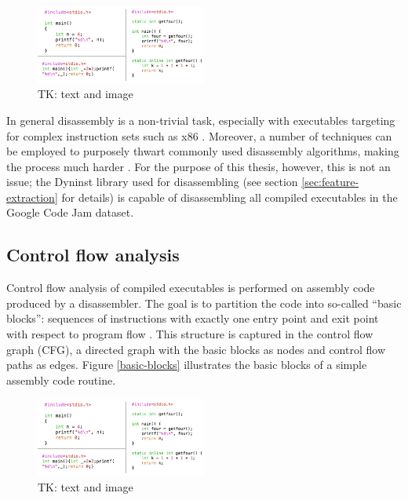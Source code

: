 \documentclass[a4paper,11pt]{kth-mag}
\begin{document}
\begin{figure}[!htb]
    \centering
    \includegraphics[width=0.5\textwidth]{3x4}
    \caption{TK: text and image}
    \label{fig:disasm}
\end{figure}

In general disassembly is a non-trivial task, especially with executables
targeting for complex instruction sets such as x86
\parencite{wartell2011differentiating}. Moreover, a number of techniques can be
employed to purposely thwart commonly used disassembly algorithms, making the
process much harder \parencite{linn2003obfuscation}. For the purpose of this
thesis, however, this is not an issue; the Dyninst library used for
disassembling (see section \ref{sec:feature-extraction} for details) is capable
of disassembling all compiled executables in the Google Code Jam dataset.

\subsection{Control flow analysis}
Control flow analysis of compiled executables is performed on assembly code
produced by a disassembler. The goal is to partition the code into so-called
``basic blocks'': sequences of instructions with exactly one entry point and
exit point with respect to program flow \parencite{allen1970control}. This
structure is captured in the control flow graph (CFG), a directed graph with
the basic blocks as nodes and control flow paths as edges. Figure
\ref{basic-blocks} illustrates the basic blocks of a simple assembly code
routine.

\begin{figure}[!htb]
    \centering
    \includegraphics[width=0.5\textwidth]{3x4}
    \caption{TK: text and image}
    \label{fig:basic-blocks}
\end{figure}
\end{document}
